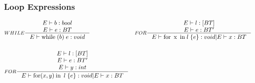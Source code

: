 \subsubsection{Loop Expressions}
\begin{align*}
&\inference[$WHILE$]{E \vdash b : bool \\
                  E \vdash e : BT}
                 {E \vdash \mathbin{\textrm{while}} \; (b) \; {e}: void}
&
&\inference[$FOR$]{E \vdash l : [BT] \\
                  E \vdash e : BT'}
                 {E \vdash \mathbin{\textrm{for}} \; \mathbin{\textrm{x}} \; \mathbin{\textrm{in}} \; {l} \; \{e\}: void	| E \vdash x : BT}
\\\\
&\inference[$FOR$]{E \vdash l : [BT] \\
                  E \vdash e : BT' \\
									E \vdash y : int}
                 {E \vdash \mathbin{\textrm{for}} (x,y) \mathbin{\textrm{in}} \; {l} \; \{e\}: void	| E \vdash x : BT}
\end{align*}